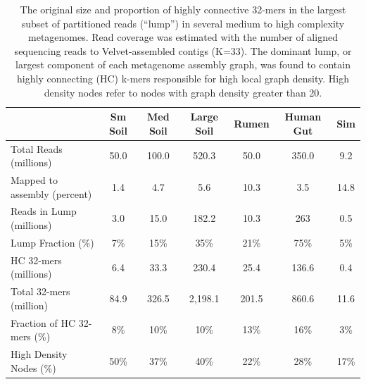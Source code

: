 \documentclass[10pt]{article}
\begin{document}



\pagebreak

\begin{table}[h]
\centering
\caption{The original size and proportion of highly connective 32-mers in the largest subset of partitioned reads (``lump'') in several medium to high complexity metagenomes.  Read coverage was estimated with the number of aligned sequencing reads to Velvet-assembled contigs (K=33).  The dominant lump, or largest component of each metagenome assembly graph, was found to contain highly connecting (HC) k-mers responsible for high local graph density.  High density nodes refer to nodes with graph density greater than 20.}
\begin{tabular}{l c c c c c c }
& Sm Soil & Med Soil & Large Soil & Rumen & Human Gut & Sim  \\
\hline
Total Reads (millions) & 50.0 & 100.0 & 520.3 & 50.0 & 350.0 & 9.2 \\
Mapped to assembly (percent) & 1.4 & 4.7 & 5.6 & 10.3 & 3.5 & 14.8 \\
Reads in Lump (millions) & 3.0  & 15.0 & 182.2 & 10.3  & 263  & 0.5  \\
Lump Fraction (\%) & 7\% & 15\% & 35\% & 21\% & 75\% & 5\%\\
HC 32-mers (millions) & 6.4 & 33.3 & 230.4 & 25.4 & 136.6 & 0.4\\
Total 32-mers (million) & 84.9 & 326.5 & 2,198.1 & 201.5 & 860.6 & 11.6\\
Fraction of HC 32-mers (\%) & 8\% & 10\% & 10\% & 13\% & 16\% & 3\% \\
High Density Nodes (\%) & 50\% & 37\% & 40\% & 22\% & 28\% & 17\% \\
\hline
\end{tabular}
\label{data-summary}
\end{table}
\end{document}
